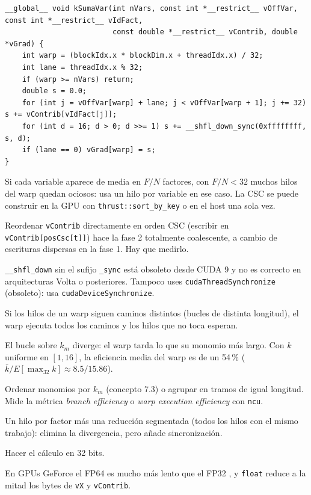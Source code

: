 \como
\begin{lstlisting}[language=CUDA]
__global__ void kSumaVar(int nVars, const int *__restrict__ vOffVar, const int *__restrict__ vIdFact,
                         const double *__restrict__ vContrib, double *vGrad) {
    int warp = (blockIdx.x * blockDim.x + threadIdx.x) / 32;
    int lane = threadIdx.x % 32;
    if (warp >= nVars) return;
    double s = 0.0;
    for (int j = vOffVar[warp] + lane; j < vOffVar[warp + 1]; j += 32) s += vContrib[vIdFact[j]];
    for (int d = 16; d > 0; d >>= 1) s += __shfl_down_sync(0xffffffff, s, d);
    if (lane == 0) vGrad[warp] = s;
}
\end{lstlisting}
Si cada variable aparece de media en $F/N$ factores, con $F/N<32$ muchos hilos del warp quedan ociosos: usa un hilo por variable en ese caso. La CSC se puede construir en la GPU con \texttt{thrust::sort\_by\_key} o en el host una sola vez.

\alt Reordenar \texttt{vContrib} directamente en orden CSC (escribir en \texttt{vContrib[posCsc[t]]}) hace la fase 2 totalmente coalescente, a cambio de escrituras dispersas en la fase 1. Hay que medirlo.

\begin{trampa}
\texttt{\_\_shfl\_down} sin el sufijo \texttt{\_sync} está obsoleto desde CUDA 9 y no es correcto en arquitecturas Volta o posteriores. Tampoco uses \texttt{cudaThreadSynchronize} (obsoleto): usa \texttt{cudaDeviceSynchronize}.
\end{trampa}

\que Si los hilos de un warp siguen caminos distintos (bucles de distinta longitud), el warp ejecuta todos los caminos y los hilos que no toca esperan.

\porque El bucle sobre $k_m$ diverge: el warp tarda lo que su monomio más largo. Con $k$ uniforme en $[1,16]$, la eficiencia media del warp es de un 54\,\% ($\bar k/E[\max_{32} k]\approx8.5/15.86$).

\como Ordenar monomios por $k_m$ (concepto 7.3) o agrupar en tramos de igual longitud. Mide la métrica \emph{branch efficiency} o \emph{warp execution efficiency} con \texttt{ncu}.

\alt Un hilo por factor más una reducción segmentada (todos los hilos con el mismo trabajo): elimina la divergencia, pero añade sincronización.

\que Hacer el cálculo en 32 bits.

\porque En GPUs GeForce el FP64 es mucho más lento que el FP32 \pv, y \texttt{float} reduce a la mitad los bytes de \texttt{vX} y \texttt{vContrib}.

